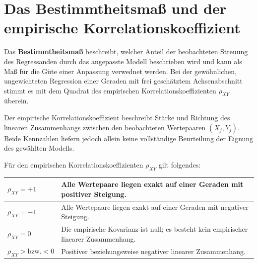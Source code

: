 


\section{Das Bestimmtheitsmaß und der empirische Korrelationskoeffizient}

Das \textbf{Bestimmtheitsmaß} beschreibt, welcher Anteil der
beobachteten Streuung des Regressanden durch das angepasste
Modell beschrieben wird und kann als Maß für die Güte einer Anpassung verwednet werden. Bei der gewöhnlichen, ungewichteten
Regression einer Geraden mit frei geschätztem Achsenabschnitt
stimmt es mit dem Quadrat des empirischen
Korrelationskoeffizienten $\rho_{XY}$ überein.

Der empirische Korrelationskoeffizient beschreibt Stärke und
Richtung des linearen Zusammenhangs zwischen den beobachteten
Wertepaaren $(X_j,Y_j)$. Beide Kennzahlen liefern jedoch allein
keine vollständige Beurteilung der Eignung des gewählten Modells.

Für den empirischen Korrelationskoeffizienten $\rho_{XY}$ gilt folgendes:

\begin{center}
	\begin{tabular}
		{|p{100pt}|p{209pt}|} \hline
		$\rho_{XY} = + 1$&
		Alle Wertepaare liegen exakt auf einer Geraden mit positiver Steigung. \\
		\hline $\rho_{XY} = - 1$&
		Alle Wertepaare liegen exakt auf einer Geraden mit negativer Steigung. \\
		\hline $\rho_{XY} = 0$&
		Die empirische Kovarianz ist null; es besteht kein empirischer linearer Zusammenhang. \\
		\hline $\rho_{XY} > \mbox{bzw.} < 0$&
		Positiver beziehungsweise negativer linearer Zusammenhang. \\
		\hline
	\end{tabular}
\end{center}

